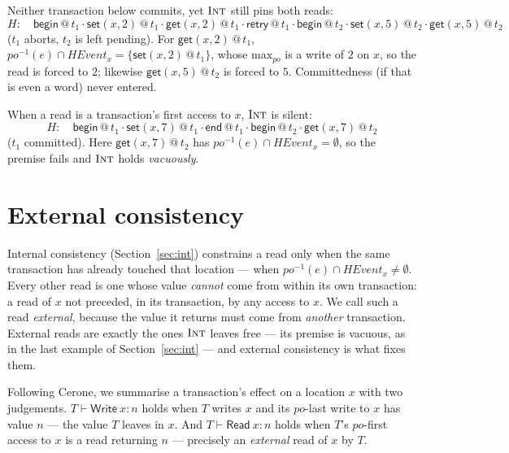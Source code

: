 \documentclass[manuscript,nonacm]{acmart}
\makeatletter
\theoremstyle{acmdefinition}
\newcommand{\bbegin}{\textsf{begin}}
\newcommand{\eend}{\textsf{end}}
\newcommand{\retry}{\textsf{retry}}
\newcommand{\getev}[3]{\textsf{get}(#1,#2)\,@\,#3}
\newcommand{\setev}[3]{\textsf{set}(#1,#2)\,@\,#3}
\newcommand{\HEvent}{\mathit{HEvent}}
\newcommand{\po}{\mathit{po}}
\newcommand{\maxpo}{\mathrm{max}_{\po}}
\makeatother
\begin{document}
\begin{example}
Neither transaction below commits, yet $\textsc{Int}$ still pins both reads:
\[
H:\quad \bbegin\,@\,t_1 \cdot \setev{x}{2}{t_1} \cdot \getev{x}{2}{t_1} \cdot \retry\,@\,t_1
      \cdot \bbegin\,@\,t_2 \cdot \setev{x}{5}{t_2} \cdot \getev{x}{5}{t_2}
\]
($t_1$ aborts, $t_2$ is left pending). For $\getev{x}{2}{t_1}$,
$\po^{-1}(e)\cap\HEvent_x = \{\setev{x}{2}{t_1}\}$, whose $\maxpo$ is a write of $2$
on $x$, so the read is forced to $2$; likewise $\getev{x}{5}{t_2}$ is forced to
$5$. Committedness (if that is even a word) never entered.
\end{example}

\begin{example}
When a read is a transaction's first access to $x$, $\textsc{Int}$ is silent:
\[
H:\quad \bbegin\,@\,t_1 \cdot \setev{x}{7}{t_1} \cdot \eend\,@\,t_1
      \cdot \bbegin\,@\,t_2 \cdot \getev{x}{7}{t_2}
\]
($t_1$ committed). Here $\getev{x}{7}{t_2}$ has
$\po^{-1}(e)\cap\HEvent_x = \emptyset$, so the premise fails and $\textsc{Int}$
holds \emph{vacuously}.
\end{example}

\section{External consistency}
\label{sec:ext}

Internal consistency (Section~\ref{sec:int}) constrains a read only when the same
transaction has already touched that location --- when
$\po^{-1}(e) \cap \HEvent_x \neq \emptyset$. Every other read is one whose value
\emph{cannot} come from within its own transaction: a read of $x$ not preceded, in
its transaction, by any access to $x$. We call such a read \emph{external},
because the value it returns must come from \emph{another} transaction. External
reads are exactly the ones $\textsc{Int}$ leaves free --- its premise is vacuous,
as in the last example of Section~\ref{sec:int} --- and external consistency is
what fixes them.

Following Cerone, we summarise a transaction's effect on a location $x$ with two
judgements. $T \vdash \mathsf{Write}\ x : n$ holds when $T$ writes $x$ and its
$\po$-last write to $x$ has value $n$ --- the value $T$ leaves in $x$. And
$T \vdash \mathsf{Read}\ x : n$ holds when $T$'s $\po$-first access to $x$ is a read
returning $n$ --- precisely an \emph{external} read of $x$ by $T$.
\end{document}
